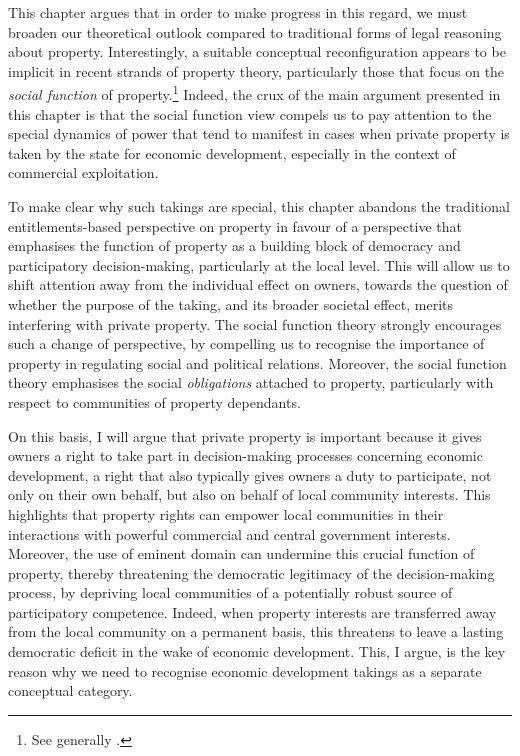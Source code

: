 This chapter argues that in order to make progress in this regard, we must broaden our theoretical outlook compared to traditional forms of legal reasoning about property. Interestingly, a suitable conceptual reconfiguration appears to be implicit in recent strands of property theory, particularly those that focus on the {\it social function} of property.\footnote{See generally \cite{alexander09a,foster11,singer00,underkuffler03,alexander06,alexander10,dagan11}.} Indeed, the crux of the main argument presented in this chapter is that the social function view compels us to pay attention to the special dynamics of power that tend to manifest in cases when private property is taken by the state for economic development, especially in the context of commercial exploitation.

To make clear why such takings are special, this chapter abandons the traditional entitlements-based perspective on property in favour of a perspective that emphasises the function of property as a building block of democracy and participatory decision-making, particularly at the local level. This will allow us to shift attention away from the individual effect on owners, towards the question of whether the purpose of the taking, and its broader societal effect, merits interfering with private property. The social function theory strongly encourages such a change of perspective, by compelling us to recognise the importance of property in regulating social and political relations. Moreover, the social function theory emphasises the social {\it obligations} attached to property, particularly with respect to communities of property dependants. 

On this basis, I will argue that private property is important because it gives owners a right to take part in decision-making processes concerning economic development, a right that also typically gives owners a duty to participate, not only on their own behalf, but also on behalf of local community interests. This highlights that property rights can empower local communities in their interactions with powerful commercial and central government interests. Moreover, the use of eminent domain can undermine this crucial function of property, thereby threatening the democratic legitimacy of the decision-making process, by depriving local communities of a potentially robust source of participatory competence. Indeed, when property interests are transferred away from the local community on a permanent basis, this threatens to leave a lasting democratic deficit in the wake of economic development. This, I argue, is the key reason why we need to recognise economic development takings as a separate conceptual category.

